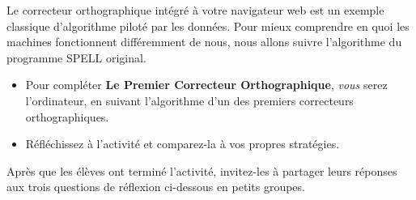\documentclass[12pt,a4paper]{article}
\begin{document}
Le correcteur orthographique intégré à votre navigateur web est un exemple classique d'algorithme piloté par les données. Pour mieux comprendre en quoi les machines fonctionnent différemment de nous, nous allons suivre l'algorithme du programme SPELL original.

\begin{activitybox}
  \begin{itemize}
    \item Pour compléter \textbf{Le Premier Correcteur Orthographique}, \emph{vous} serez l'ordinateur, en suivant l'algorithme d'un des premiers correcteurs orthographiques.
    \item Réfléchissez à l'activité et comparez-la à vos propres stratégies.
  \end{itemize}
\end{activitybox}

\begin{instructornotes}
  Après que les élèves ont terminé l'activité, invitez-les à partager leurs réponses aux trois questions de réflexion ci-dessous en petits groupes.
\end{instructornotes}
\end{document}

